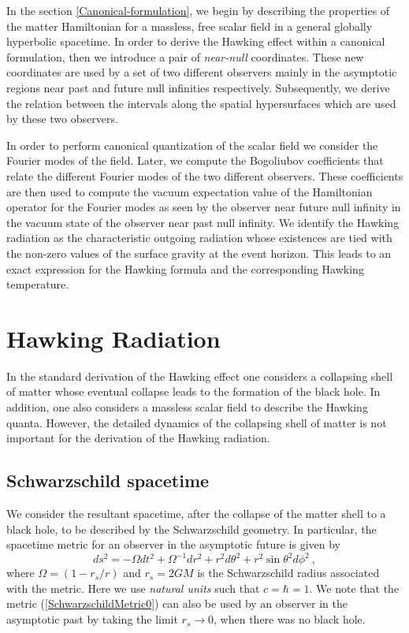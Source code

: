 \documentclass[aps,twocolumn,showpacs]{revtex4}
\def\rs{r_s}
\begin{document}
In the section \ref{Canonical-formulation}, we begin by describing the 
properties of the matter Hamiltonian for a massless, free scalar field in a 
general globally hyperbolic spacetime. In order to derive the Hawking effect 
within a canonical formulation, then we introduce a pair of \emph{near-null} 
coordinates. These new coordinates are used by a set of two different 
observers mainly in the asymptotic regions near past and future null infinities 
respectively. Subsequently, we derive the relation between the intervals along 
the spatial hypersurfaces which are used by these two observers. 



In order to perform canonical quantization of the scalar field we consider the 
Fourier modes of the field. Later, we compute the Bogoliubov coefficients that 
relate the different Fourier modes of the two different observers. These 
coefficients are then used to compute the vacuum expectation value of the 
Hamiltonian operator for the Fourier modes as seen by the observer near future 
null infinity in the vacuum state of the observer near past null infinity. We 
identify the Hawking radiation as the characteristic outgoing radiation whose 
existences are tied with the non-zero values of the surface gravity at the event 
horizon. This leads to an exact expression for the Hawking formula and the 
corresponding Hawking temperature.






\section{Hawking Radiation}\label{Hawking-radiation-review}

In the standard derivation of the Hawking effect \cite{hawking1975} one 
considers a collapsing shell of matter whose eventual collapse leads to the 
formation of the black hole. In addition, one also considers a massless scalar 
field to describe the Hawking quanta. However, the detailed dynamics of the 
collapsing shell of matter is not important for the derivation of the Hawking 
radiation.



\subsection{Schwarzschild spacetime}

We consider the resultant spacetime, after the collapse of the matter shell to 
a black hole, to be described by the Schwarzschild geometry. In particular, the 
spacetime metric for an observer in the asymptotic future is given by
%
\begin{equation}\label{SchwarzschildMetric0}
ds^2 = - \Omega dt^2 + \Omega^{-1} dr^2 
+ r^2 d\theta^2 + r^2 \sin\theta^2 d\phi^2 ~,
\end{equation}
%
where $\Omega = \left(1- r_s /r\right)$ and $r_s = 2 G M$ is the 
Schwarzschild radius associated with the metric. Here we use 
\emph{natural units} such that $c=\hbar=1$. We note that the metric 
(\ref{SchwarzschildMetric0}) can also be used by an observer in the asymptotic 
past by taking the limit $\rs\to0$, when there was no black hole.
\end{document}
